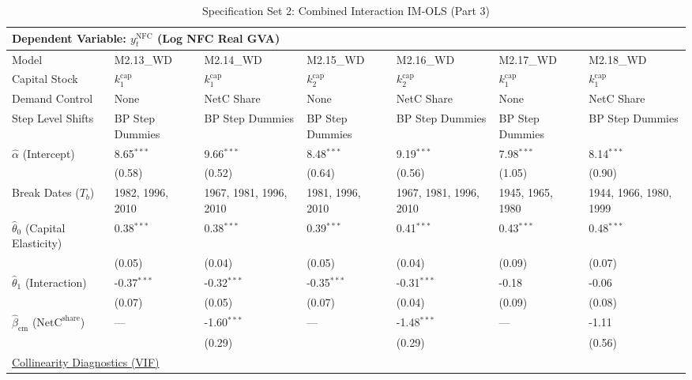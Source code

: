 \begin{table}[H]
\centering
\caption{Specification Set 2: Combined Interaction IM-OLS (Part 3)}
\label{tab:paper_spec_set_2_3}
\scriptsize
\begin{tabular}{p{3.8cm}p{1.35cm}p{1.35cm}p{1.35cm}p{1.35cm}p{1.35cm}p{1.35cm}}
\toprule
\multicolumn{7}{l}{\textbf{Dependent Variable: $y_t^{\text{NFC}}$ (Log NFC Real GVA)}} \\
\midrule
Model & M2.13\_WD & M2.14\_WD & M2.15\_WD & M2.16\_WD & M2.17\_WD & M2.18\_WD  \\
Capital Stock & $k^{\text{cap}}_1$ & $k^{\text{cap}}_1$ & $k^{\text{cap}}_2$ & $k^{\text{cap}}_2$ & $k^{\text{cap}}_1$ & $k^{\text{cap}}_1$  \\
Demand Control & None & NetC Share & None & NetC Share & None & NetC Share  \\
Step Level Shifts & BP Step Dummies & BP Step Dummies & BP Step Dummies & BP Step Dummies & BP Step Dummies & BP Step Dummies  \\
\midrule
$\hat{\alpha}$ (Intercept)  & 8.65$^{***}$ & 9.66$^{***}$ & 8.48$^{***}$ & 9.19$^{***}$ & 7.98$^{***}$ & 8.14$^{***}$  \\
 & {\scriptsize (0.58)} & {\scriptsize (0.52)} & {\scriptsize (0.64)} & {\scriptsize (0.56)} & {\scriptsize (1.05)} & {\scriptsize (0.90)}  \\
Break Dates ($T_b$) & 1982, 1996, 2010 & 1967, 1981, 1996, 2010 & 1981, 1996, 2010 & 1967, 1981, 1996, 2010 & 1945, 1965, 1980 & 1944, 1966, 1980, 1999  \\
[1ex]
$\hat{\theta}_0$ (Capital Elasticity)  & 0.38$^{***}$ & 0.38$^{***}$ & 0.39$^{***}$ & 0.41$^{***}$ & 0.43$^{***}$ & 0.48$^{***}$  \\
 & {\scriptsize (0.05)} & {\scriptsize (0.04)} & {\scriptsize (0.05)} & {\scriptsize (0.04)} & {\scriptsize (0.09)} & {\scriptsize (0.07)}  \\
$\hat{\theta}_1$ (Interaction)  & -0.37$^{***}$ & -0.32$^{***}$ & -0.35$^{***}$ & -0.31$^{***}$ & -0.18 & -0.06  \\
 & {\scriptsize (0.07)} & {\scriptsize (0.05)} & {\scriptsize (0.07)} & {\scriptsize (0.04)} & {\scriptsize (0.09)} & {\scriptsize (0.08)}  \\
$\hat{\beta}_{\text{cm}}$ ($\text{NetC}^{\text{share}}$)  & --- & -1.60$^{***}$ & --- & -1.48$^{***}$ & --- & -1.11  \\
 &  & {\scriptsize (0.29)} &  & {\scriptsize (0.29)} &  & {\scriptsize (0.56)}  \\
\midrule
\multicolumn{7}{l}{\underline{Collinearity Diagnostics (VIF)}} \\

\end{tabular}
\end{table}

